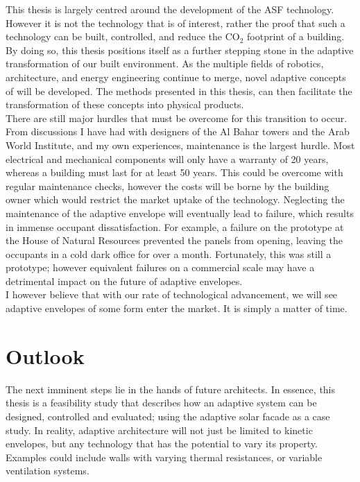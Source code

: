 This thesis is largely centred around the development of the ASF technology. However it is not the technology that is of interest, rather the proof that such a technology can be built, controlled, and reduce the CO$_2$ footprint of a building. By doing so, this thesis positions itself as a further stepping stone in the adaptive transformation of our built environment. As the multiple fields of robotics, architecture, and energy engineering continue to merge, novel adaptive concepts of will be developed. The methods presented in this thesis, can then facilitate the transformation of these concepts into physical products. \\

There are still major hurdles that must be overcome for this transition to occur. From discussions I have had with designers of the Al Bahar towers and the Arab World Institute, and my own experiences, maintenance is the largest hurdle. Most electrical and mechanical components will only have a warranty of 20 years, whereas a building must last for at least 50 years. This could be overcome with regular maintenance checks, however the costs will be borne by the building owner which would restrict the market uptake of the technology. Neglecting the maintenance of the adaptive envelope will eventually lead to failure, which results in immense occupant dissatisfaction. For example, a failure on the prototype at the House of Natural Resources prevented the panels from opening, leaving the occupants in a cold dark office for over a month. Fortunately, this was still a prototype; however equivalent failures on a commercial scale may have a detrimental impact on the future of adaptive envelopes. \\

I however believe that with our rate of technological advancement, we will see adaptive envelopes of some form enter the market. It is simply a matter of time.




\section{Outlook}
\label{ch:mainoutlook}

The next imminent steps lie in the hands of future architects. In essence, this thesis is a feasibility study that describes how an adaptive system can be designed, controlled and evaluated; using the adaptive solar facade as a case study. In reality, adaptive architecture will not just be limited to kinetic envelopes, but any technology that has the potential to vary its property. Examples could include walls with varying thermal resistances, or variable ventilation systems. 

